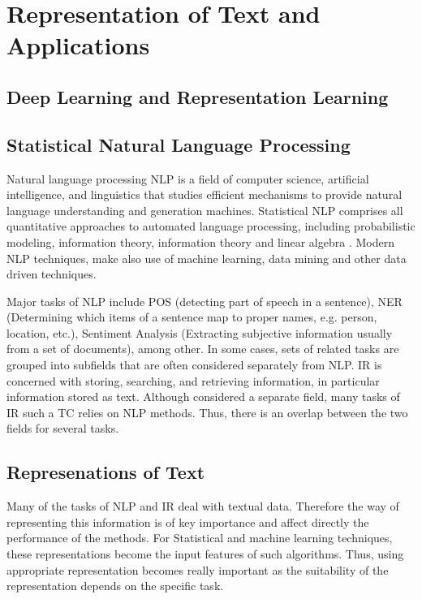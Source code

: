 
\chapter{Representation of Text and Applications}
\label{chap:related_work}

\section{Deep Learning and Representation Learning}
 \label{sec:deep_learning}

\section{Statistical Natural Language Processing}
\label{sec:rel_nlp}
Natural language processing \ac{NLP} is a field of computer science,
artificial intelligence, and linguistics that studies efficient mechanisms to
provide natural language understanding and generation  machines. 
Statistical \ac{NLP} comprises all quantitative approaches to automated
language processing, including probabilistic modeling, information theory,
information theory and linear algebra \cite{Manning:1999:FSN:311445}.  Modern
\ac{NLP}  techniques,  make also use of  machine learning, data mining  and other data
driven techniques.

Major tasks of \ac{NLP} include  \ac{POS} (detecting part of speech in a
sentence), \ac{NER}  (Determining which items of a sentence map to proper
names, e.g. person, location, etc.),   Sentiment Analysis (Extracting
subjective information usually from a set of documents), among other. 
In some cases, sets of related tasks are grouped into subfields that are often
considered separately from \ac{NLP}. \ac{IR} is concerned with storing,
searching, and retrieving information, in particular  information stored as
text. Although considered a separate field, many tasks of \ac{IR} such a
\ac{TC} relies on \ac{NLP} methods. Thus, there is an overlap between the two
fields for several tasks.



\section{Represenations of Text}
 \label{sec:rel_represenation_text}
  Many of the tasks of \ac{NLP} and \ac{IR} deal with textual data. Therefore
  the way  of representing this information is of key importance and affect
  directly the performance of the methods.  For  Statistical and machine
  learning techniques, these representations become the input features of
  such algorithms. Thus, using appropriate representation  becomes really
  important as the suitability of the representation  depends on the specific
  task.
  
